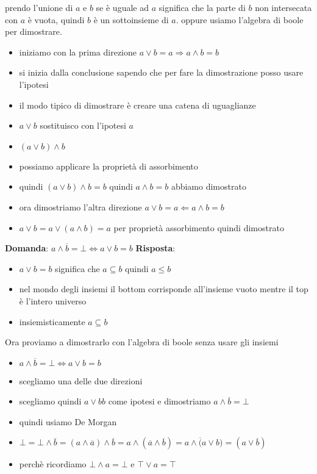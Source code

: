 \documentclass{article}
\begin{document}
prendo l'unione di $a$ e $b$ se è uguale ad $a$ significa che la parte di $b$ non intersecata con $a$ è vuota, quindi $b$ è un sottoinsieme di $a$. oppure usiamo l'algebra di boole per dimostrare. \\
\begin{itemize}
    \item iniziamo con la prima direzione $a \lor b = a \Rightarrow a \land b = b$
    \item si inizia dalla conclusione sapendo che per fare la dimostrazione posso usare l'ipotesi
    \item il modo tipico di dimostrare è creare una catena di uguaglianze
    \item $a \lor b$ sostituisco con l'ipotesi $a$
    \item $(a \lor b) \land b$
    \item possiamo applicare la proprietà di assorbimento
    \item quindi $(a \lor b) \land b = b$ quindi $a \land b = b$ abbiamo dimostrato
    \item ora dimostriamo l'altra direzione $a \lor b = a \Leftarrow a \land b = b$
    \item $a \lor b = a \lor (a \land b)=a$ per proprietà assorbimento quindi dimostrato
\end{itemize}
\textbf{Domanda}: $a \land \overline{b} = \bot \iff a \lor b = b$
\textbf{Risposta}:
\begin{itemize}
    \item $a \lor b = b$ significa che $a \subseteq b$ quindi $a \leq b$
    \item nel mondo degli insiemi il bottom corrisponde all'insieme vuoto mentre il top è l'intero universo
    \item insiemisticamente $a \subseteq b$
\end{itemize}
Ora proviamo a dimostrarlo con l'algebra di boole senza usare gli insiemi
\begin{itemize}
    \item $a \land \overline{b} = \bot \iff a \lor b = b$
    \item scegliamo una delle due direzioni
    \item scegliamo quindi $a \lor b b$ come ipotesi e dimostriamo $a \land \overline{b} = \bot$
    \item quindi usiamo De Morgan
    \item $\bot = \bot \land \overline{b} = (a \land \overline{a}) \land \overline{b} = a \land (\overline{a} \land \overline{b}) = a \land \overline(a \lor b) = (a \lor \overline{b})$
    \item perchè ricordiamo $\bot \land a = \bot$ e $\top \lor a = \top$
\end{itemize}
\end{document}

